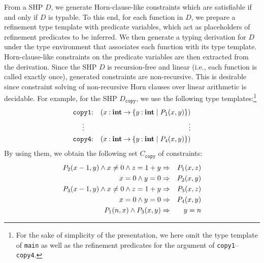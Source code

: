 From a SHP \(D\), we generate Horn-clause-like constraints which are 
satisfiable if and only if \(D\) is typable.  To this end, for each 
function in \(D\), we prepare a refinement type template with predicate 
variables, which act as placeholders of refinement predicates to be 
inferred.  We then generate a typing derivation for \(D\) under the type 
environment that associates each function with its type template.  
Horn-clause-like constraints on the predicate variables are then 
extracted from the derivation.  Since the SHP \(D\) is recursion-free 
and linear (i.e., each function is called exactly once), generated 
constraints are non-recursive.  This is desirable since constraint 
solving of non-recursive Horn clauses over linear arithmetic is 
decidable.  For example, for the SHP \(D_{\texttt{copy}}\), we use the 
following type templates:\footnote{For the sake of simplicity of the 
presentation, we here omit the type template of \texttt{main} as well as 
the refinement predicates for the argument of 
\texttt{copy1}--\texttt{copy4}.}
\begin{eqnarray*}
\texttt{copy1}&\mathbin{:}&(x\mathbin{:}{\mathbf{int}}\mathbin{\rightarrow}{\{{y\mathbin{:}\mathbf{int} \mid P_1(x,y)}\}}) \\
\vdots\quad &&\qquad\qquad \vdots \\
\texttt{copy4}&\mathbin{:}&(x\mathbin{:}{\mathbf{int}}\mathbin{\rightarrow}{\{{y\mathbin{:}\mathbf{int} \mid P_4(x,y)}\}})
\end{eqnarray*}
By using them, we obtain the following set \(C_{\texttt{copy}}\) of 
constraints:
\begin{eqnarray*}
P_2(x-1,y) \land x\neq0 \land z=1+y &\Rightarrow& P_1(x,z) \\
x=0 \land y=0 &\Rightarrow& P_2(x,y) \\
P_4(x-1,y) \land x\neq0 \land z=1+y &\Rightarrow& P_3(x,z) \\
x=0 \land y=0 &\Rightarrow& P_4(x,y) \\
P_1(n,x) \land P_3(x,y) &\Rightarrow& y=n
\end{eqnarray*}

